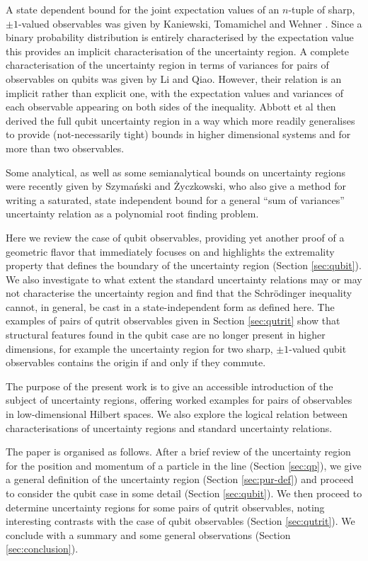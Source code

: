 A state dependent bound for the joint expectation values of an $n$-tuple of sharp, $\pm 1$-valued observables was given by Kaniewski, Tomamichel and Wehner \cite{KaniewskiTomamichelWehner2015}. Since a binary probability distribution is entirely characterised by the expectation value this provides an implicit characterisation of the uncertainty region. A complete characterisation of the uncertainty region in terms of variances for pairs of observables on qubits was given by Li and Qiao\cite{LiQiao2015}. However, their relation is an implicit rather than explicit one, with the expectation values and variances of each observable appearing on both sides of the inequality. Abbott et al\cite{AbbottAlzieuHallBranciard2016}  then derived the full qubit uncertainty region in a way which more readily generalises to provide (not-necessarily tight) bounds in higher dimensional systems and for more than two observables.

Some analytical, as well as some semianalytical bounds on uncertainty regions were recently given by Szymański and \.{Z}yczkowski\cite{SzymanskiZyczkowski2018}, who also give a method for writing a saturated, state independent bound for a general ``sum of variances'' uncertainty relation as a polynomial root finding problem.

Here we review the case of qubit observables, providing yet another proof of a geometric flavor that immediately focuses on and highlights the extremality property that defines the boundary of the uncertainty region (Section \ref{sec:qubit}). We also investigate to what extent the standard uncertainty relations may or may not characterise the uncertainty region and find that the Schr\"odinger inequality cannot, in general, be cast in a state-independent form as defined here. The examples of pairs of qutrit observables given in Section \ref{sec:qutrit} show that structural features found in the qubit case are no longer present in higher dimensions, for example the uncertainty region for two sharp, $\pm 1$-valued qubit observables contains the origin if and only if they commute.

The purpose of the present work is to give an accessible introduction of the subject of uncertainty regions, offering worked examples for pairs of observables in low-dimensional Hilbert spaces. We also explore the logical relation between characterisations of uncertainty regions and standard uncertainty relations.

The  paper is organised as follows. After a brief review of the uncertainty region for the position and momentum of a particle in the line (Section \ref{sec:qp}), we give a general definition of the uncertainty region (Section \ref{sec:pur-def}) and proceed to consider the qubit case in some detail (Section \ref{sec:qubit}). We then proceed to determine uncertainty regions for some pairs of qutrit observables, noting interesting contrasts with the case of qubit observables (Section \ref{sec:qutrit}). We conclude with a summary and some general observations (Section \ref{sec:conclusion}).

